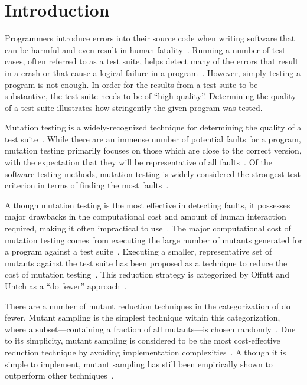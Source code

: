 
\section{Introduction}

Programmers introduce errors into their source code when writing software that can be harmful and even result in human
fatality~\cite{vicente2003programming}.  Running a number of test cases, often referred to as a test suite, helps detect
many of the errors that result in a crash or that cause a logical failure in a program~\cite{wagner2005comparing}.
However, simply testing a program is not enough. In order for the results from a test suite to be substantive, the test
suite needs to be of ``high quality''.  Determining the quality of a test suite illustrates how stringently the given
program was tested.

Mutation testing is a widely-recognized technique for determining the quality of a test
suite~\cite{gopinath2015mutation}. While there are an immense number of potential faults for a program, mutation testing
primarily focuses on those which are close to the correct version, with the expectation that they will be representative
of all faults~\cite{jia2011analysis}.  Of the software testing methods, mutation testing is widely considered the
strongest test criterion in terms of finding the most faults~\cite{ammann2008introduction}.

Although mutation testing is the most effective in detecting faults, it possesses major drawbacks in the computational
cost and amount of human interaction required, making it often impractical to use~\cite{gopinath2015mutation,
wong1995reducing, gopinath2015empirical}.  The major computational cost of mutation testing comes from executing the
large number of mutants generated for a program against a test suite~\cite{offutt1993experimental}. Executing a smaller,
representative set of mutants against the test suite has been proposed as a technique to reduce the cost of mutation
testing~\cite{jia2011analysis, wong1995reducing, offutt1993experimental, offutt2001mutation}.  This reduction strategy
is categorized by Offutt and Untch as a ``do fewer'' approach~\cite{offutt2001mutation}.

There are a number of mutant reduction techniques in the categorization of do fewer.  Mutant sampling is the simplest
technique within this categorization, where a subset---containing a fraction of all mutants---is chosen
randomly~\cite{wong1995reducing}.  Due to its simplicity, mutant sampling is considered to be the most cost-effective
reduction technique by avoiding implementation complexities~\cite{gopinath2015mutation}.  Although it is simple to
implement, mutant sampling has still been empirically shown to outperform other techniques~\cite{zhang2010operator}.

